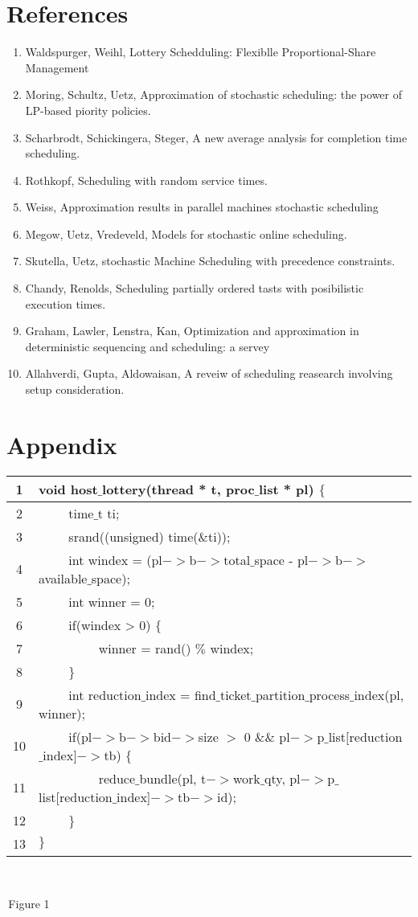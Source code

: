 \documentclass[acmsmall]{acmart}
\def\tab{\,$\quad \quad$\,}
\def\small{\,\par \smallskip\,}
\begin{document}
\section{References}
\begin{enumerate}
  \item Waldspurger, Weihl, Lottery Schedduling: Flexiblle Proportional-Share
    Management
  \item Moring, Schultz, Uetz, Approximation of stochastic scheduling: the
    power of LP-based piority policies.
  \item Scharbrodt, Schickingera, Steger, A new average analysis for completion
    time scheduling.
  \item Rothkopf, Scheduling with random service times.
  \item Weiss, Approximation results in parallel machines stochastic scheduling
  \item Megow, Uetz, Vredeveld, Models for stochastic online scheduling.
  \item Skutella, Uetz, stochastic Machine Scheduling with precedence
    constraints.
  \item Chandy, Renolds, Scheduling partially ordered tasts with posibilistic
    execution times.
  \item Graham, Lawler, Lenstra, Kan, Optimization and approximation in
    deterministic sequencing and scheduling: a servey
  \item Allahverdi, Gupta, Aldowaisan, A reveiw of scheduling reasearch
    involving setup consideration.
\end{enumerate}

\section{Appendix}
\begin{tabular}{c|l}
  \hline
  1 & void host$\_$lottery(thread * t, proc$\_$list * pl) $\{$ \\
  \hline
  2 & \tab time$\_$t ti; \\
  3 & \tab srand((unsigned) time($\&$ti)); \\
  4 & \tab int windex = (pl$->$b$->$total$\_$space - pl$->$b$->$available$\_$space); \\
  5 & \tab int winner = 0; \\
  6 & \tab if(windex > 0) $\{$ \\
  7 & \tab \tab winner = rand() $\%$ windex; \\
  8 & \tab $\}$ \\
  9 & \tab int reduction$\_$index = find$\_$ticket$\_$partition$\_$process$\_$index(pl, winner); \\
  10 & \tab if(pl$->$b$->$bid$->$size $>$ 0 $\&\&$ pl$->$p$\_$list$[$reduction$\_$index$]->$tb) $\{$ \\
  11 & \tab \tab reduce$\_$bundle(pl, t$->$work$\_$qty, pl$->$p$\_$list[reduction$\_$index]$->$tb$->$id); \\
  12 & \tab $\}$ \\
  13 & $\}$ \\
  \hline
\end{tabular}
\par
\small{Figure 1}
\end{document}
